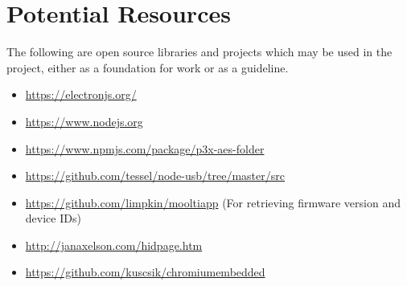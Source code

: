 \documentclass{article}
\begin{document}
\section{Potential Resources}
The following are open source libraries and projects which may be used in the
project, either as a foundation for work or as a guideline.
\begin{itemize}
\item \url{https://electronjs.org/}
\item \url{https://www.nodejs.org}
\item \url{https://www.npmjs.com/package/p3x-aes-folder}
\item \url{https://github.com/tessel/node-usb/tree/master/src}
\item \url{https://github.com/limpkin/mooltiapp} (For retrieving 
      firmware version and device IDs)
\item \url{http://janaxelson.com/hidpage.htm}
\item \url{https://github.com/kuscsik/chromiumembedded}
\end{itemize}
\end{document}
